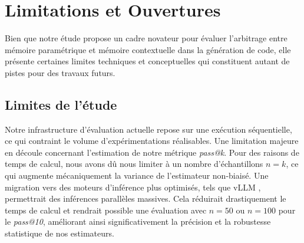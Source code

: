 \documentclass[11pt, a4paper]{article}
\begin{document}
\section{Limitations et Ouvertures}

Bien que notre étude propose un cadre novateur pour évaluer l'arbitrage entre mémoire paramétrique et mémoire contextuelle dans la génération de code, elle présente certaines limites techniques et conceptuelles qui constituent autant de pistes pour des travaux futurs.

\subsection{Limites de l'étude}

Notre infrastructure d'évaluation actuelle repose sur une exécution séquentielle, ce qui contraint le volume d'expérimentations réalisables. Une limitation majeure en découle concernant l'estimation de notre métrique \textit{pass@k}. Pour des raisons de temps de calcul, nous avons dû nous limiter à un nombre d'échantillons $n=k$, ce qui augmente mécaniquement la variance de l'estimateur non-biaisé. Une migration vers des moteurs d'inférence plus optimisés, tels que vLLM , permettrait des inférences parallèles massives. Cela réduirait drastiquement le temps de calcul et rendrait possible une évaluation avec $n=50$ ou $n=100$ pour le \textit{pass@10}, améliorant ainsi significativement la précision et la robustesse statistique de nos estimateurs.
\end{document}
